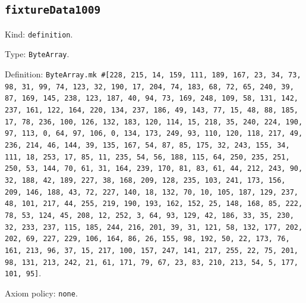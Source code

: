 \documentclass[11pt]{article}
\begin{document}
\subsection*{\texttt{fixtureData1009}}
\noindent Kind: \texttt{definition}.\par
\noindent Type: \texttt{ByteArray}.\par
\noindent Definition: \texttt{ByteArray.mk \#[228, 215, 14, 159, 111, 189, 167, 23, 34, 73, 98, 31, 99, 74, 123, 32, 190, 17, 204, 74, 183, 68, 72, 65, 240, 39, 87, 169, 145, 238, 123, 187, 40, 94, 73, 169, 248, 109, 58, 131, 142, 237, 161, 122, 164, 220, 134, 237, 186, 49, 143, 77, 15, 48, 88, 185, 17, 78, 236, 100, 126, 132, 183, 120, 114, 15, 218, 35, 240, 224, 190, 97, 113, 0, 64, 97, 106, 0, 134, 173, 249, 93, 110, 120, 118, 217, 49, 236, 214, 46, 144, 39, 135, 167, 54, 87, 85, 175, 32, 243, 155, 34, 111, 18, 253, 17, 85, 11, 235, 54, 56, 188, 115, 64, 250, 235, 251, 250, 53, 144, 70, 61, 31, 164, 239, 170, 81, 83, 61, 44, 212, 243, 90, 32, 188, 42, 189, 227, 38, 168, 209, 128, 235, 103, 241, 173, 156, 209, 146, 188, 43, 72, 227, 140, 18, 132, 70, 10, 105, 187, 129, 237, 48, 101, 217, 44, 255, 219, 190, 193, 162, 152, 25, 148, 168, 85, 222, 78, 53, 124, 45, 208, 12, 252, 3, 64, 93, 129, 42, 186, 33, 35, 230, 32, 233, 237, 115, 185, 244, 216, 201, 39, 31, 121, 58, 132, 177, 202, 202, 69, 227, 229, 106, 164, 86, 26, 155, 98, 192, 50, 22, 173, 76, 161, 213, 96, 37, 15, 217, 100, 157, 247, 141, 217, 255, 22, 75, 201, 98, 131, 213, 242, 21, 61, 171, 79, 67, 23, 83, 210, 213, 54, 5, 177, 101, 95]}.\par
\noindent Axiom policy: \texttt{none}.\par
\end{document}
